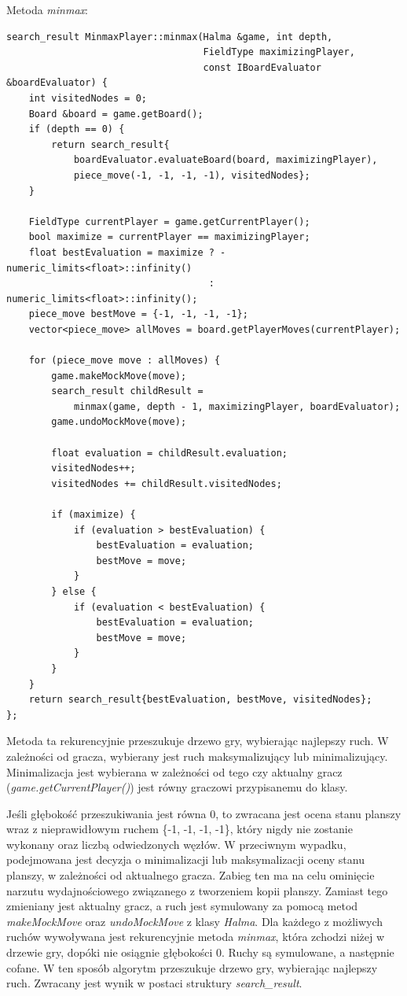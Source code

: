 \documentclass[a4paper, 12pt]{article}
\begin{document}
Metoda \textit{minmax}:
\begin{lstlisting}
search_result MinmaxPlayer::minmax(Halma &game, int depth,
                                   FieldType maximizingPlayer,
                                   const IBoardEvaluator &boardEvaluator) {
    int visitedNodes = 0;
    Board &board = game.getBoard();
    if (depth == 0) {
        return search_result{
            boardEvaluator.evaluateBoard(board, maximizingPlayer),
            piece_move(-1, -1, -1, -1), visitedNodes};
    }

    FieldType currentPlayer = game.getCurrentPlayer();
    bool maximize = currentPlayer == maximizingPlayer;
    float bestEvaluation = maximize ? -numeric_limits<float>::infinity()
                                    : numeric_limits<float>::infinity();
    piece_move bestMove = {-1, -1, -1, -1};
    vector<piece_move> allMoves = board.getPlayerMoves(currentPlayer);

    for (piece_move move : allMoves) {
        game.makeMockMove(move);
        search_result childResult =
            minmax(game, depth - 1, maximizingPlayer, boardEvaluator);
        game.undoMockMove(move);

        float evaluation = childResult.evaluation;
        visitedNodes++;
        visitedNodes += childResult.visitedNodes;

        if (maximize) {
            if (evaluation > bestEvaluation) {
                bestEvaluation = evaluation;
                bestMove = move;
            }
        } else {
            if (evaluation < bestEvaluation) {
                bestEvaluation = evaluation;
                bestMove = move;
            }
        }
    }
    return search_result{bestEvaluation, bestMove, visitedNodes};
};
\end{lstlisting}
Metoda ta rekurencyjnie przeszukuje drzewo gry, wybierając najlepszy ruch.
W zależności od gracza, wybierany jest ruch maksymalizujący lub minimalizujący.
Minimalizacja jest wybierana w zależności od tego czy aktualny gracz (\textit{game.getCurrentPlayer()})
jest równy graczowi przypisanemu do klasy.

Jeśli głębokość przeszukiwania jest równa 0, to zwracana jest ocena stanu planszy
wraz z nieprawidłowym ruchem \{-1, -1, -1, -1\}, który nigdy nie zostanie wykonany oraz 
liczbą odwiedzonych węzłów. W przeciwnym wypadku, podejmowana jest decyzja o minimalizacji 
lub maksymalizacji oceny stanu planszy, w zależności od aktualnego gracza. Zabieg ten
ma na celu ominięcie narzutu wydajnościowego związanego z tworzeniem kopii planszy.
Zamiast tego zmieniany jest aktualny gracz, a ruch jest symulowany za pomocą metod
\textit{makeMockMove} oraz \textit{undoMockMove} z klasy \textit{Halma}. 
Dla każdego z możliwych ruchów wywoływana jest rekurencyjnie metoda \textit{minmax}, która 
zchodzi niżej w drzewie gry, dopóki nie osiągnie głębokości 0. Ruchy są symulowane, a następnie
cofane. W ten sposób algorytm przeszukuje drzewo gry, wybierając najlepszy ruch. 
Zwracany jest wynik w postaci struktury \textit{search\_result}.
\end{document}
